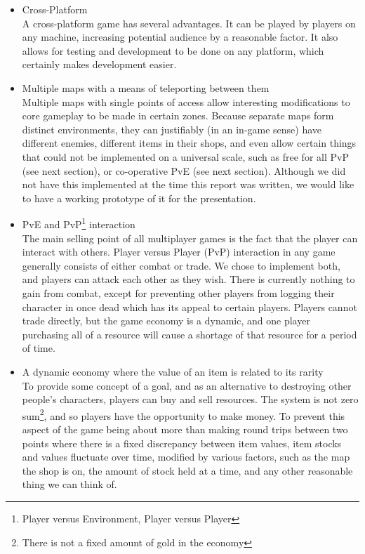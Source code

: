 \documentclass[12pt]{amsart}
\begin{document}
  \begin{itemize}
    \item Cross-Platform\\
      A cross-platform game has several advantages. It can be played by players
      on any machine, increasing potential audience by a reasonable factor. It
      also allows for testing and development to be done on any platform, which
      certainly makes development easier.  

    \item Multiple maps with a means of teleporting between them\\
      Multiple maps with single points of access allow interesting modifications
      to core gameplay to be made in certain zones.  Because separate maps form
      distinct environments,  they can justifiably (in an in-game sense) have
      different enemies,  different items in their shops,  and even allow certain
      things that could not be implemented on a universal scale,  such as free
      for all PvP (see next section), or co-operative PvE (see next section).
      Although we did not have this implemented at the time this report was
      written, we would like to have a working prototype of it for the presentation.

    \item PvE and PvP\footnote{Player versus Environment, Player versus Player}
    interaction\\
      The main selling point of all multiplayer games is the fact that the player can
      interact with others.  Player versus Player (PvP) interaction in any game generally 
      consists of either combat or trade.  We chose to implement both,  and players can
      attack each other as they wish.  There is currently nothing to gain
      from combat,  except for preventing other players from logging their character
      in once dead which has its appeal to certain players.  Players cannot trade
      directly, but the game economy is a dynamic,  and one player purchasing all
      of a resource will cause a shortage of that resource for a period of time.

    \item A dynamic economy where the value of an item is related to its
    rarity\\
      To provide some concept of a goal,  and as an alternative to destroying
      other people's characters,  players can buy and sell resources.  The system 
      is not zero sum\footnote{There is not a fixed amount of gold in the economy}, and
      so players have the opportunity to make money. To prevent this aspect of the game
      being about more than making round trips between two points where there 
      is a fixed discrepancy between item values,  item stocks and values fluctuate over time,
      modified by various factors,  such as the map the shop is on,  the amount of stock
      held at a time,  and any other reasonable thing we can think of.


  \end{itemize}
\end{document}

